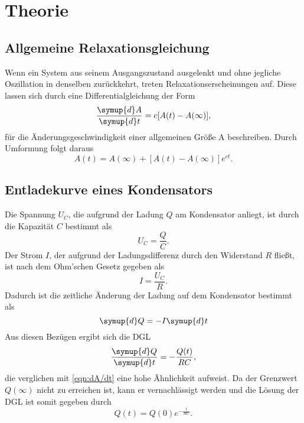 \section{Theorie}
\label{sec:Theorie}

\subsection{Allgemeine Relaxationsgleichung}
Wenn ein System aus seinem Ausgangszustand ausgelenkt und ohne jegliche Oszillation in denselben zurückkehrt, treten Relaxationserscheinungen auf. Diese lassen sich durch
eine Differentialgleichung der Form
\begin{equation}
    \label{eqn:dA/dt}
    \frac{\symup{d}A}{\symup{d}t} = c[A(t)-A(\infty)],
\end{equation}
für die Änderungsgeschwindigkeit einer allgemeinen Größe A beschreiben.
Durch Umformung folgt daraus
\begin{equation}
    \label{eqn:AllgemeineRelaxationsgleichung}
    A(t)=A(\infty)+[A(t)-A(\infty)]e^{ct}.
\end{equation}


\subsection{Entladekurve eines Kondensators}
Die Spannung $U_C$, die aufgrund der Ladung $Q$ am Kondensator anliegt, ist durch die Kapazität $C$ bestimmt als
\begin{equation*}
    U_C=\frac{Q}{C}.
\end{equation*}
Der Strom $I$, der aufgrund der Ladungsdifferenz durch den Widerstand $R$ fließt, ist nach dem Ohm'schen Gesetz gegeben als
\begin{equation*}
    I=\frac{U_C}{R}.
\end{equation*}
Dadurch ist die zeitliche Änderung der Ladung auf dem Kondensator bestimmt als
\begin{equation*}
    \symup{d}Q=-I\symup{d}t
\end{equation*}
Aus diesen Bezügen ergibt sich die DGL
\begin{equation}
    \label{eqn:dQ/dt}
    \frac{\symup{d}Q}{\symup{d}t}=-\frac{Q(t)}{RC},
\end{equation}
die verglichen mit \autoref{eqn:dA/dt} eine hohe Ähnlichkeit aufweist. Da der Grenzwert $Q(\infty)$ nicht zu erreichen ist, kann er vernachlässigt werden und die Lösung
der DGL ist somit gegeben durch
\begin{equation}
    \label{eqn:Entladung}
    Q(t)=Q(0)e^{-\frac{t}{RC}}.
\end{equation}


